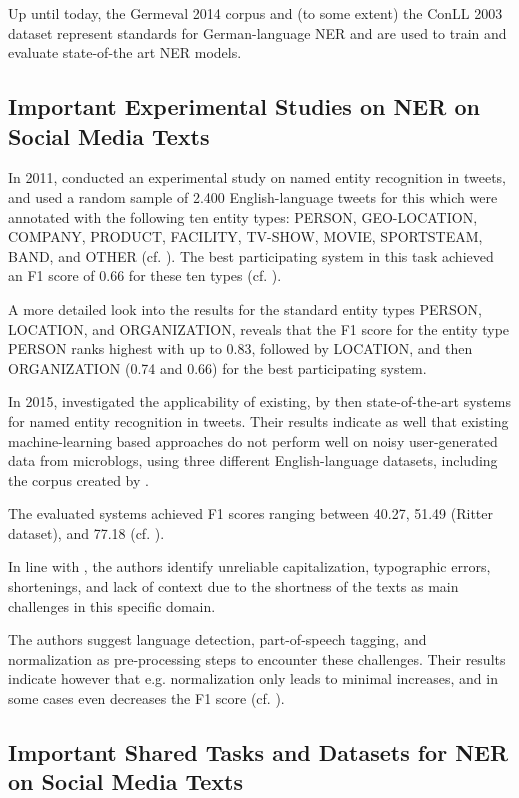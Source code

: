 Up until today, the Germeval 2014 corpus and (to some extent) the ConLL 2003 dataset represent standards for German-language NER and are used to train and evaluate state-of-the art NER models. 

\subsection{Important Experimental Studies on NER on Social Media Texts}

In 2011, \citeauthor{ritter_2011} conducted an experimental study on named entity recognition in tweets, and used a random sample of 2.400 English-language tweets for this which were annotated with the following ten entity types: PERSON, GEO-LOCATION, COMPANY, PRODUCT,  FACILITY, TV-SHOW, MOVIE, SPORTSTEAM, BAND, and OTHER (cf. \cite{ritter_2011}).  The best participating system in this task achieved an F1 score of 0.66 for these ten types (cf. \cite{ritter_2011}). 

A more detailed look into the results for the standard entity types PERSON, LOCATION, and ORGANIZATION, reveals that the F1 score for the entity type PERSON ranks highest with up to 0.83, followed by LOCATION, and then ORGANIZATION (0.74 and 0.66) for the best participating system. 

In 2015, \citeauthor{derczynski_analysis_2015} investigated the applicability of existing, by then state-of-the-art systems for named entity recognition in tweets. Their results indicate as well that existing machine-learning based approaches do not perform well on noisy user-generated data from microblogs, using three different English-language datasets, including the corpus created by \cite{ritter_2011}.

The evaluated systems achieved F1 scores ranging between 40.27, 51.49 (Ritter dataset), and 77.18 (cf. \cite{derczynski_analysis_2015}). 

In line with \cite{ritter_2011}, the authors identify unreliable capitalization, typographic errors, shortenings, and lack of context due to the shortness of the texts as main challenges in this specific domain. 

The authors suggest language detection, part-of-speech tagging, and normalization as pre-processing steps to encounter these challenges. Their results indicate however that e.g. normalization only leads to minimal increases, and in some cases even decreases the F1 score (cf. \cite{derczynski_analysis_2015}).

\subsection{Important Shared Tasks and Datasets for NER on Social Media Texts}
\label{sec:shared_tasks_sm}

